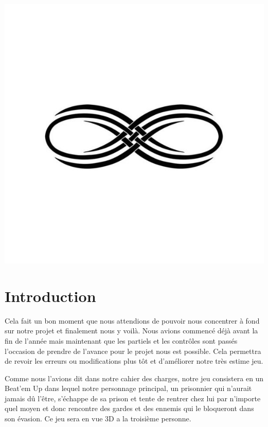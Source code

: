 \documentclass{article}
\begin{document}
\begin{center}
\includegraphics[scale=00.20]{infini}
\end{center}

\newpage
\thispagestyle{empty}
\tableofcontents

\newpage
\fontsize{12}{12}
\section{Introduction}

\par
Cela fait un bon moment que nous attendions de pouvoir nous concentrer à fond sur notre projet et finalement nous y voilà. Nous avions commencé déjà avant la fin de l'année mais maintenant que les partiels et les contrôles sont passés l'occasion de prendre de l'avance pour le projet nous est possible. Cela permettra de revoir les erreurs ou modifications plus tôt et d'améliorer notre très estime jeu.
\newline

\par
Comme nous l'avions dit dans notre cahier des charges, notre jeu consistera en un Beat'em Up dans lequel notre personnage principal, un prisonnier qui n'aurait jamais dû l'être, s'échappe de sa prison et tente de rentrer chez lui par n'importe quel moyen et donc rencontre des gardes et des ennemis qui le bloqueront dans son évasion. Ce jeu sera en vue 3D a la troisième personne.
\newline
\end{document}

